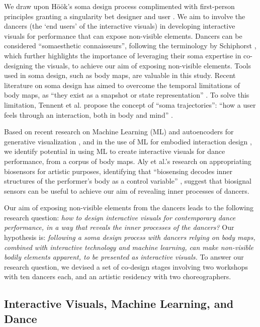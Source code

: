 We draw upon Höök's soma design process complimented with first-person principles granting a singularity bet designer and user \cite{hook_designing_2018}. We aim to involve the dancers (the ‘end users’ of the interactive visuals) in developing interactive visuals for performance that can expose non-visible elements. Dancers can be considered “somaesthetic connaisseurs”, following the terminology by Schiphorst \cite{schiphorst_self-evidence_2011}, which further highlights the importance of leveraging their soma expertise in co-designing the visuals, to achieve our aim of exposing non-visible elements. Tools used in soma design, such as body maps, are valuable in this study. Recent literature on soma design has aimed to overcome the temporal limitations of body maps, as “they exist as a snapshot or state representation” \cite{tennent_articulating_2021}. To solve this limitation, Tennent et al. propose the concept of “soma trajectories”: “how a user feels through an interaction, both in body and mind”  \cite{tennent_articulating_2021}.

Based on recent research on Machine Learning (ML) and autoencoders for generative visualization \cite{broad_autoencoding_2017, crnkovic-friis_generative_2016}, and in the use of ML for embodied interaction design \cite{plant_movement_2020}, we identify potential in using ML to create interactive visuals for dance performance, from a corpus of body maps. Aly et al.’s research on appropriating biosensors for artistic purposes, identifying that “biosensing decodes inner structures of the performer’s body as a control variable” \cite{aly_appropriating_2021}, suggest that biosignal sensors can be useful to achieve our aim of revealing inner processes of dancers.

Our aim of exposing non-visible elements from the dancers leads to the following research question: \textit{how to design interactive visuals for contemporary dance performance, in a way that reveals the inner processes of the dancers?} Our hypothesis is: \textit{following a soma design process with dancers relying on body maps, combined with interactive technology and machine learning, can make non-visible bodily elements apparent, to be presented as interactive visuals.} To answer our research question, we devised a set of co-design stages involving two workshops with ten dancers each, and an artistic residency with two choreographers.

\subsection{Interactive Visuals, Machine Learning, and Dance}

